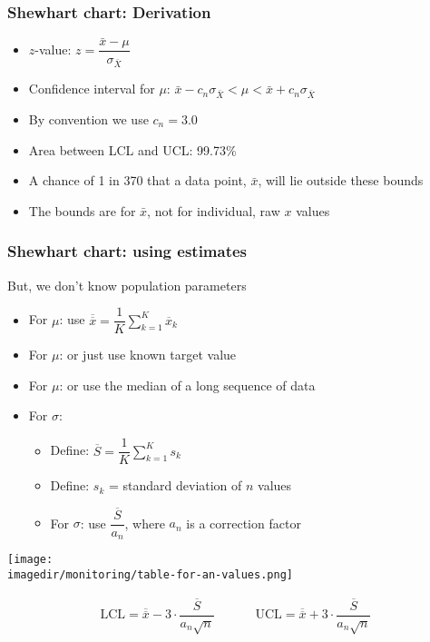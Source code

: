 \begin{frame}\frametitle{Shewhart chart: Derivation}
	\begin{itemize}
		\item	$z$-value: $z = \dfrac{\bar{x} - \mu}{\sigma_{\bar{X}}}$
	\end{itemize}
	\begin{itemize}
		\item	Confidence interval for $\mu$: $\bar{x} - c_n\sigma_{\bar{X}} < \mu < \bar{x} + c_n\sigma_{\bar{X}}$
	\end{itemize}
	\begin{itemize}
		\item	By convention we use $c_n = 3.0$
		\item	Area between LCL and UCL: 99.73\%
		\item	A chance of 1 in 370 that a data point, $\bar{x}$, will lie outside these bounds
		\item	The bounds are for $\bar{x}$, not for individual, raw $x$ values
	\end{itemize}
\end{frame}

\begin{frame}\frametitle{Shewhart chart: using estimates}

	But, we don't know population parameters
	\begin{itemize}
		\item	For $\mu$: use $\overline{\overline{x}} = \dfrac{1}{K} \displaystyle \sum_{k=1}^{K}{ \overline{x}_k}$
		\item	For $\mu$: or just use known target value
		\item	For $\mu$: or use the median of a long sequence of data
		\item	For $\sigma$:
		\begin{itemize}
			\item	Define: $\overline{S} = \dfrac{1}{K} \displaystyle \sum_{k=1}^{K}{s_k}$
			\item	Define: $s_k$ = standard deviation of $n$ values
			\item	For $\sigma$: use $\dfrac{\overline{S}}{a_n}$, where $a_n$ is a correction factor
		\end{itemize}
	\end{itemize}

	\begin{center}
		\texttt{[image: \\imagedir/monitoring/table-for-an-values.png]}
	\end{center}
	
	$$
	\begin{array}{rcccl}
		\text{LCL} = \overline{\overline{x}} - 3 \cdot \dfrac{\overline{S}}{a_n\sqrt{n}} && && \text{UCL} = \overline{\overline{x}} + 3 \cdot \dfrac{\overline{S}}{a_n\sqrt{n}}
	\end{array}
	$$
\end{frame}

